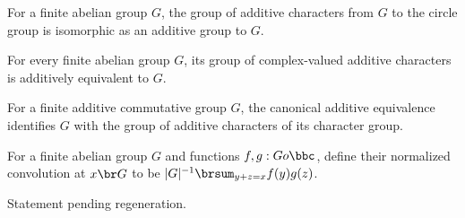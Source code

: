 \begin{definition}
\label{FABL.circleCharacterAddEquiv}
\leanok
{}
For a finite abelian group $G$, the group of additive characters from $G$ to the circle
group is isomorphic as an additive group to $G$.
\end{definition}

\begin{definition}
\label{FABL.abelianDualAddEquiv}
\leanok
{}
For every finite abelian group $G$, its group of complex-valued additive characters is
additively equivalent to $G$.
\end{definition}

\begin{definition}
\label{FABL.abelianDoubleDualAddEquiv}
\leanok
{}
For a finite additive commutative group $G$, the canonical additive equivalence
identifies $G$ with the group of additive characters of its character group.
\end{definition}

\begin{definition}
\label{FABL.abelianConvolution}
\leanok
For a finite abelian group $G$ and functions $f,g:G	o\bbc$, define their normalized
convolution at $x\br G$ to be $|G|^{-1}\brsum_{y+z=x} f(y)g(z)$.
\end{definition}

\begin{theorem}
\label{FABL.abelianConvolution_apply}
\leanok
{}
Statement pending regeneration.
\end{theorem}

